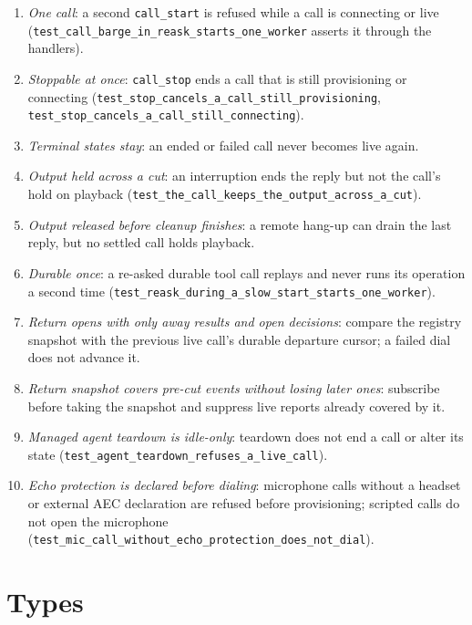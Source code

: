\documentclass[a4paper,10pt,fleqn]{article}
\begin{document}
\begin{enumerate}
  \item[C1] \emph{One call}: a second \texttt{call\_start} is refused while a
    call is connecting or live (\texttt{test\_call\_barge\_in\_reask\_starts\_one\_worker}
    asserts it through the handlers).
  \item[C2] \emph{Stoppable at once}: \texttt{call\_stop} ends a call that is
    still provisioning or connecting
    (\texttt{test\_stop\_cancels\_a\_call\_still\_provisioning},
    \texttt{test\_stop\_cancels\_a\_call\_still\_connecting}).
  \item[C3] \emph{Terminal states stay}: an ended or failed call never
    becomes live again.
  \item[C4] \emph{Output held across a cut}: an interruption ends the reply
    but not the call's hold on playback
    (\texttt{test\_the\_call\_keeps\_the\_output\_across\_a\_cut}).
  \item[C5] \emph{Output released before cleanup finishes}: a remote hang-up
    can drain the last reply, but no settled call holds playback.
  \item[C6] \emph{Durable once}: a re-asked durable tool call replays and
    never runs its operation a second time
    (\texttt{test\_reask\_during\_a\_slow\_start\_starts\_one\_worker}).
  \item[C7] \emph{Return opens with only away results and open decisions}:
    compare the registry snapshot with the previous live call's durable departure
    cursor; a failed dial does not advance it.
  \item[C8] \emph{Return snapshot covers pre-cut events without losing later ones}:
    subscribe before taking the snapshot and suppress live reports already
    covered by it.
  \item[C9] \emph{Managed agent teardown is idle-only}: teardown does not
    end a call or alter its state
    (\texttt{test\_agent\_teardown\_refuses\_a\_live\_call}).
  \item[C10] \emph{Echo protection is declared before dialing}: microphone
    calls without a headset or external AEC declaration are refused before
    provisioning; scripted calls do not open the microphone
    (\texttt{test\_mic\_call\_without\_echo\_protection\_does\_not\_dial}).
\end{enumerate}

\section{Types}
\end{document}
